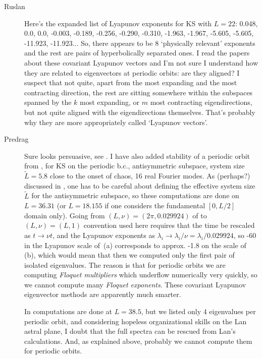 \begin{description}
\item[Ruslan]
 Here's the expanded list of Lyapunov exponents for KS with $L = 22$:
 0.048,    0.0,    0.0,   -0.003,   -0.189,   -0.256,   -0.290,   -0.310,
-1.963,   -1.967,   -5.605,   -5.605,  -11.923,  -11.923...
So, there appears to be 8 `physically relevant' exponents and
the rest are pairs of hyperbolically separated ones.  I read
the papers about these covariant Lyapunov vectors and I'm not
sure I understand how they are related to eigenvectors at
periodic orbits: are they aligned?  I suspect that not quite,
apart from the most expanding and the most contracting
direction, the rest are sitting somewhere within the
subspaces spanned by the $k$ most expanding, or $m$ most
contracting eigendirections, but not quite aligned with the
eigendirections themselves.  That's probably why they are
more appropriately called `Lyapunov vectors'.

\item[Predrag]
Sure looks persuasive, see . I have also
added stability of a periodic orbit from
, for KS on the periodic b.c.,
antisymmetric subspace, system size $\tilde{L} = 5.8$ close
to the onset of chaos, 16 real Fourier modes. As (perhaps?)
discussed in , one has to be careful about
defining the effective system size $\tilde{L}$ for the
antisymmetric subspace, so these computations are done on
$L=36.31$ (or $L = 18.155$ if one considers the fundamental
$[0,L/2]$ domain only). Going from $(L,\nu) =
(2\pi,0.029924)$ of  to $(L,\nu) =
(L,1)$ convention used here requires that the time be
rescaled as $t \to \nu t$, and the Lyapunov exponents as
$\lambda_i \to \lambda_i/ \nu = \lambda_i/ 0.029924 $, so -60
in the Lyapunov scale of \,(a)
corresponds to approx. -1.8 on the scale of
\,(b), which would mean that then we
computed only the first pair of isolated eigenvalues. The
reason is that for periodic orbits we are computing {\em
Floquet multipliers} which underflow numerically very
quickly, so we cannot compute many {\em Floquet exponents}.
These covariant Lyapunov eigenvector methods are apparently
much smarter.

In  computations are done at $L = 38.5$,
but we listed only 4 eigenvalues per periodic orbit, and
considering hopeless organizational skills on the Lan astral
plane, I doubt that the full spectra can be rescued from
Lan's calculations. And, as explained above, probably we cannot
compute them for periodic orbits.


\end{description}
